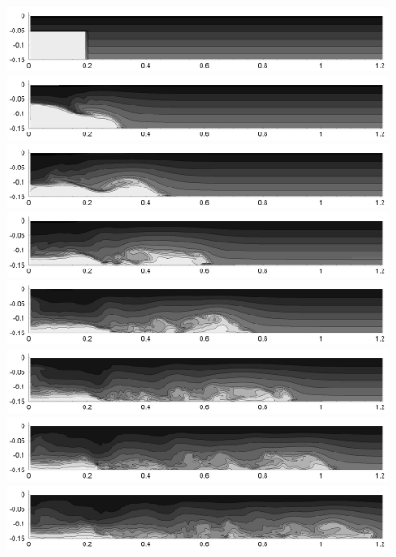 \begin{figure}[htbp]
  \begin{center}    \includegraphics[scale=0.55]{../figures/colocated/Fig9case/140-60-03-VE-6/01.png}    \includegraphics[scale=0.55]{../figures/colocated/Fig9case/140-60-03-VE-6/02.png}
\includegraphics[scale=0.55]{../figures/colocated/Fig9case/140-60-03-VE-6/03.png}
\includegraphics[scale=0.55]{../figures/colocated/Fig9case/140-60-03-VE-6/04.png}    \includegraphics[scale=0.55]{../figures/colocated/Fig9case/140-60-03-VE-6/05.png}
\includegraphics[scale=0.55]{../figures/colocated/Fig9case/140-60-03-VE-6/06.png}
\includegraphics[scale=0.55]{../figures/colocated/Fig9case/140-60-03-VE-6/07.png}    \includegraphics[scale=0.55]{../figures/colocated/Fig9case/140-60-03-VE-6/08.png}

\end{center}
\end{figure}
